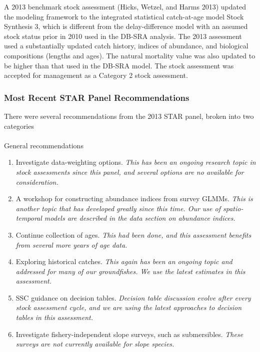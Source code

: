 \documentclass[
]{scrartcl}
\makeatletter
\let\oldparagraph\paragraph
\renewcommand{\paragraph}{
    \@ifstar
      \xxxParagraphStar
      \xxxParagraphNoStar
  }
\newcommand{\xxxParagraphStar}[1]{\oldparagraph*{#1}\mbox{}}
\newcommand{\xxxParagraphNoStar}[1]{\oldparagraph{#1}\mbox{}}
\providecommand{\tightlist}{%
  \setlength{\itemsep}{0pt}\setlength{\parskip}{0pt}}\usepackage{longtable,booktabs,array}
\makeatother
\begin{document}
A 2013 benchmark stock assessment (Hicks, Wetzel, and Harms 2013)
updated the modeling framework to the integrated statistical
catch-at-age model Stock Synthesis 3, which is different from the
delay-difference model with an assumed stock status prior in 2010 used
in the DB-SRA analysis. The 2013 assessment used a substantially updated
catch history, indices of abundance, and biological compositions
(lengths and ages). The natural mortality value was also updated to be
higher than that used in the DB-SRA model. The stock assessment was
accepted for management as a Category 2 stock assessment.

\subsubsection{Most Recent STAR Panel
Recommendations}\label{most-recent-star-panel-recommendations}

There were several recommendations from the 2013 STAR panel, broken into
two categories

\paragraph{General recommendations}\label{general-recommendations}

\begin{enumerate}
\def\labelenumi{\arabic{enumi}.}
\tightlist
\item
  Investigate data-weighting options. \emph{This has been an ongoing
  research topic in stock assessments since this panel, and several
  options are no available for consideration.}
\item
  A workshop for constructing abundance indices from survey GLMMs.
  \emph{This is another topic that has developed greatly since this
  time. Our use of spatio-temporal models are described in the data
  section on abundance indices.}
\item
  Continue collection of ages. \emph{This had been done, and this
  assessment benefits from several more years of age data.}
\item
  Exploring historical catches. \emph{This again has been an ongoing
  topic and addressed for many of our groundfishes. We use the latest
  estimates in this assessment.}
\item
  SSC guidance on decision tables. \emph{Decision table discussion
  evolve after every stock assessment cycle, and we are using the latest
  approaches to decision tables in this assessment.}
\item
  Investigate fishery-independent slope surveys, such as submersibles.
  \emph{These surveys are not currently available for slope species.}
\end{enumerate}
\end{document}
